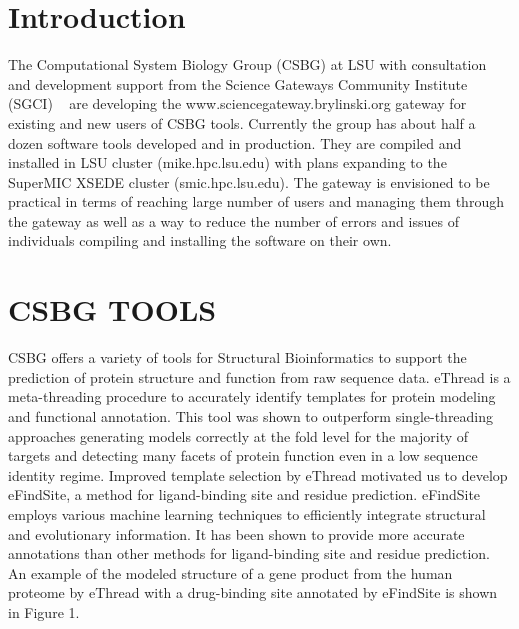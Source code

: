 \documentclass[sigconf]{acmart}
\begin{document}


\maketitle

\section{Introduction}

The Computational System Biology Group (CSBG) at LSU with consultation and development support from the Science Gateways Community Institute (SGCI) ~\cite{sgci} are developing the www.sciencegateway.brylinski.org gateway for existing and new users of CSBG tools. Currently the group has about half a dozen software tools developed and in production. They are compiled and installed in LSU cluster (mike.hpc.lsu.edu) with plans expanding to the SuperMIC XSEDE cluster (smic.hpc.lsu.edu). The gateway is envisioned to be practical in terms of reaching large number of users and managing them through the gateway as well as a way to reduce the number of errors and issues of individuals compiling and installing the software on their own. 

\section{CSBG  TOOLS}
CSBG offers a variety of tools for Structural Bioinformatics to support the prediction of protein structure and function from raw sequence data. eThread is a meta-threading procedure to accurately identify templates for protein modeling and functional annotation. This tool was shown to outperform single-threading approaches generating models correctly at the fold level for the majority of targets and detecting many facets of protein function even in a low sequence identity regime. Improved template selection by eThread motivated us to develop eFindSite, a method for ligand-binding site and residue prediction. eFindSite employs various machine learning techniques to efficiently integrate structural and evolutionary information. It has been shown to provide more accurate annotations than other methods for ligand-binding site and residue prediction. An example of the modeled structure of a gene product from the human proteome by eThread with a drug-binding site annotated by eFindSite is shown in Figure 1.
\end{document}
